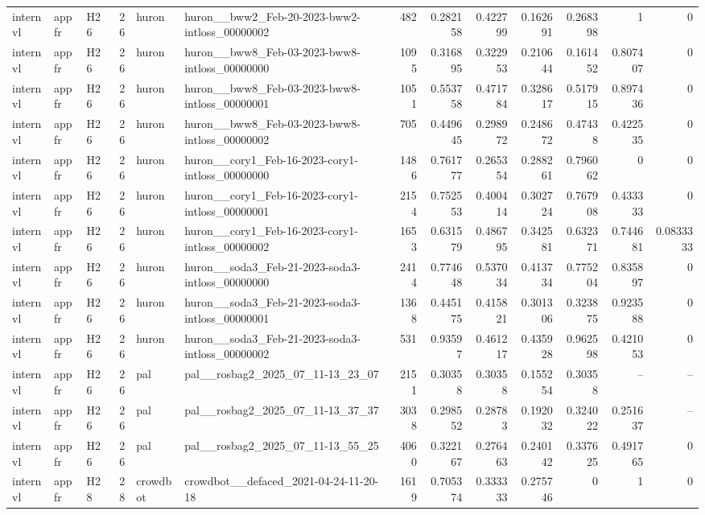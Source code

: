\begin{longtable}{lllrllrrrrrrr}
internvl & appfr & H26 & 26 & huron & huron\_\_bww2\_Feb-20-2023-bww2-intloss\_00000002 & 482 & 0.282158 & 0.422799 & 0.162691 & 0.268398 & 1 & 0 \\
internvl & appfr & H26 & 26 & huron & huron\_\_bww8\_Feb-03-2023-bww8-intloss\_00000000 & 1095 & 0.316895 & 0.322953 & 0.210644 & 0.161452 & 0.807407 & 0 \\
internvl & appfr & H26 & 26 & huron & huron\_\_bww8\_Feb-03-2023-bww8-intloss\_00000001 & 1051 & 0.553758 & 0.471784 & 0.328617 & 0.517915 & 0.897436 & 0 \\
internvl & appfr & H26 & 26 & huron & huron\_\_bww8\_Feb-03-2023-bww8-intloss\_00000002 & 705 & 0.449645 & 0.298972 & 0.248672 & 0.47438 & 0.422535 & 0 \\
internvl & appfr & H26 & 26 & huron & huron\_\_cory1\_Feb-16-2023-cory1-intloss\_00000000 & 1486 & 0.761777 & 0.265354 & 0.288261 & 0.796062 & 0 & 0 \\
internvl & appfr & H26 & 26 & huron & huron\_\_cory1\_Feb-16-2023-cory1-intloss\_00000001 & 2154 & 0.752553 & 0.400414 & 0.302724 & 0.767908 & 0.433333 & 0 \\
internvl & appfr & H26 & 26 & huron & huron\_\_cory1\_Feb-16-2023-cory1-intloss\_00000002 & 1653 & 0.631579 & 0.486795 & 0.342581 & 0.632371 & 0.744681 & 0.0833333 \\
internvl & appfr & H26 & 26 & huron & huron\_\_soda3\_Feb-21-2023-soda3-intloss\_00000000 & 2414 & 0.774648 & 0.537034 & 0.413734 & 0.775204 & 0.835897 & 0 \\
internvl & appfr & H26 & 26 & huron & huron\_\_soda3\_Feb-21-2023-soda3-intloss\_00000001 & 1368 & 0.445175 & 0.415821 & 0.301306 & 0.323875 & 0.923588 & 0 \\
internvl & appfr & H26 & 26 & huron & huron\_\_soda3\_Feb-21-2023-soda3-intloss\_00000002 & 531 & 0.93597 & 0.461217 & 0.435928 & 0.962598 & 0.421053 & 0 \\
internvl & appfr & H26 & 26 & pal & pal\_\_rosbag2\_2025\_07\_11-13\_23\_07 & 2151 & 0.30358 & 0.30358 & 0.155254 & 0.30358 & -- & -- \\
internvl & appfr & H26 & 26 & pal & pal\_\_rosbag2\_2025\_07\_11-13\_37\_37 & 3038 & 0.298552 & 0.28783 & 0.192032 & 0.324022 & 0.251637 & -- \\
internvl & appfr & H26 & 26 & pal & pal\_\_rosbag2\_2025\_07\_11-13\_55\_25 & 4060 & 0.322167 & 0.276463 & 0.240142 & 0.337625 & 0.491765 & 0 \\
internvl & appfr & H28 & 28 & crowdbot & crowdbot\_\_defaced\_2021-04-24-11-20-18 & 1619 & 0.705374 & 0.333333 & 0.275746 & 0 & 1 & 0 \\

\end{longtable}
